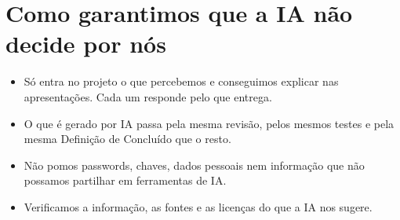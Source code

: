 \documentclass[11pt,a4paper]{article}
\begin{document}
\section{Como garantimos que a IA não decide por nós}

\begin{itemize}
  \item Só entra no projeto o que percebemos e conseguimos explicar nas apresentações. Cada um responde pelo que entrega.
  \item O que é gerado por IA passa pela mesma revisão, pelos mesmos testes e pela mesma Definição de Concluído que o resto.
  \item Não pomos passwords, chaves, dados pessoais nem informação que não possamos partilhar em ferramentas de IA.
  \item Verificamos a informação, as fontes e as licenças do que a IA nos sugere.
\end{itemize}
\end{document}
